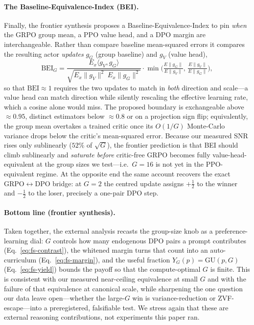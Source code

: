 \documentclass{article}
\begin{document}
\paragraph{The Baseline-Equivalence-Index (BEI).}
Finally, the frontier synthesis proposes a Baseline-Equivalence-Index
to pin \emph{when} the GRPO group mean, a PPO value head, and a DPO
margin are interchangeable. Rather than compare baseline mean-squared
errors it compares the resulting actor \emph{updates} $g_G$ (group
baseline) and $g_V$ (value head),
\begin{equation}
  \mathrm{BEI}_G =
  \frac{E_x\langle g_V, g_G\rangle}
       {\sqrt{E_x\|g_V\|^2\; E_x\|g_G\|^2}}
  \cdot
  \min\!\Big(\tfrac{E\|g_G\|}{E\|g_V\|},\,\tfrac{E\|g_V\|}{E\|g_G\|}\Big),
  \label{eq:fs-bei}
\end{equation}
so that $\mathrm{BEI}\approx 1$ requires the two updates to match in
\emph{both} direction and scale---a value head can match direction
while silently rescaling the effective learning rate, which a cosine
alone would miss. The proposed boundary is exchangeable above
$\approx 0.95$, distinct estimators below $\approx 0.8$ or on a
projection sign flip; equivalently, the group mean overtakes a trained
critic once its $O(1/G)$ Monte-Carlo variance drops below the critic's
mean-squared error. Because our measured SNR rises only sublinearly
($52\%$ of $\sqrt{G}$), the frontier prediction is that BEI should climb
sublinearly and \emph{saturate before} critic-free GRPO becomes fully
value-head-equivalent at the group sizes we test---i.e.\ $G{=}16$ is not
yet in the PPO-equivalent regime. At the opposite end the same account
recovers the exact GRPO$\leftrightarrow$DPO bridge: at $G{=}2$ the
centred update assigns $+\tfrac12$ to the winner and $-\tfrac12$ to the
loser, precisely a one-pair DPO step.

\paragraph{Bottom line (frontier synthesis).}
Taken together, the external analysis recasts the group-size knob as a
preference-learning dial: $G$ controls how many endogenous DPO pairs a
prompt contributes (Eq.~\ref{eq:fs-contrast}), the whitened margin turns
that count into an auto-curriculum (Eq.~\ref{eq:fs-margin}), and the
useful fraction $Y_G(p)=\mathrm{GU}(p,G)$ (Eq.~\ref{eq:fs-yield}) bounds
the payoff so that the compute-optimal $G$ is finite. This is consistent
with our measured near-ceiling equivalence at small $G$ and with the
failure of that equivalence at canonical scale, while sharpening the one
question our data leave open---whether the large-$G$ win is
variance-reduction or ZVF-escape---into a preregistered, falsifiable
test. We stress again that these are external reasoning contributions,
not experiments this paper ran.
 
\end{document}
